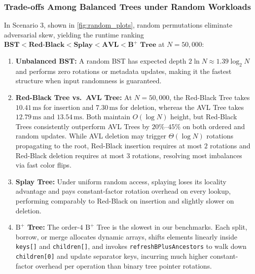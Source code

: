 \documentclass[10pt, a4paper]{article}
\newcommand{\code}[1]{\texttt{\color{primary!90!black}#1}}
\begin{document}
\subsubsection{Trade-offs Among Balanced Trees under Random Workloads}
In Scenario 3, shown in \cref{fig:random_plots}, random permutations eliminate adversarial skew, yielding the runtime ranking $\textbf{BST} < \textbf{Red-Black} < \textbf{Splay} < \textbf{AVL} < \textbf{B}^+\textbf{ Tree}$ at $N=50{,}000$:
\begin{enumerate}[label=\textbf{\color{primary}\arabic*.}]
  \item \textbf{Unbalanced BST:} A random BST has expected depth $2\ln N \approx 1.39\log_2 N$ and performs zero rotations or metadata updates, making it the fastest structure when input randomness is guaranteed.
  \item \textbf{Red-Black Tree vs.\ AVL Tree:} At $N=50{,}000$, the Red-Black Tree takes $10.41\,\text{ms}$ for insertion and $7.30\,\text{ms}$ for deletion, whereas the AVL Tree takes $12.79\,\text{ms}$ and $13.54\,\text{ms}$. Both maintain $O(\log N)$ height, but Red-Black Trees consistently outperform AVL Trees by $20\%\text{--}45\%$ on both ordered and random updates. While AVL deletion may trigger $\Theta(\log N)$ rotations propagating to the root, Red-Black insertion requires at most $2$ rotations and Red-Black deletion requires at most $3$ rotations, resolving most imbalances via fast color flips.
  \item \textbf{Splay Tree:} Under uniform random access, splaying loses its locality advantage and pays constant-factor rotation overhead on every lookup, performing comparably to Red-Black on insertion and slightly slower on deletion.
  \item \textbf{$\text{B}^+$ Tree:} The order-$4$ $\text{B}^+$ Tree is the slowest in our benchmarks. Each split, borrow, or merge allocates dynamic arrays, shifts elements linearly inside \code{keys[]} and \code{children[]}, and invokes \code{refreshBPlusAncestors} to walk down \code{children[0]} and update separator keys, incurring much higher constant-factor overhead per operation than binary tree pointer rotations.
\end{enumerate}
\end{document}
